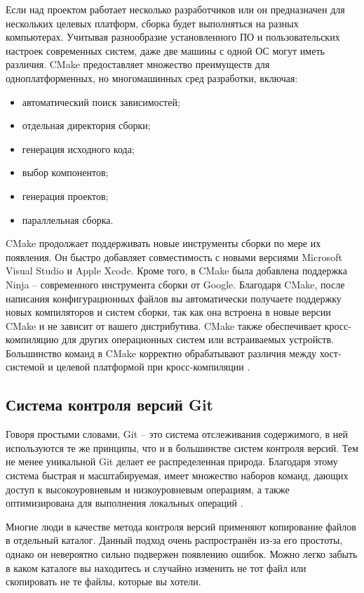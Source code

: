 Если над проектом работает несколько разработчиков или он предназначен для нескольких целевых платформ, сборка будет выполняться на разных компьютерах. Учитывая разнообразие установленного ПО и пользовательских настроек современных систем, даже две машины с одной ОС могут иметь различия. CMake предоставляет множество преимуществ для одноплатформенных, но многомашинных сред разработки, включая:
\begin{itemize}
	\item автоматический поиск зависимостей;
	\item отдельная директория сборки;
	\item генерация исходного кода;
	\item выбор компонентов;
	\item генерация проектов;
	\item параллельная сборка.
\end{itemize}

CMake продолжает поддерживать новые инструменты сборки по мере их появления. Он быстро добавляет совместимость с новыми версиями Microsoft Visual Studio и Apple Xcode. Кроме того, в CMake была добавлена поддержка Ninja -- современного инструмента сборки от Google. Благодаря CMake, после написания конфигурационных файлов вы автоматически получаете поддержку новых компиляторов и систем сборки, так как она встроена в новые версии CMake и не зависит от вашего дистрибутива. CMake также обеспечивает кросс-компиляцию для других операционных систем или встраиваемых устройств. Большинство команд в CMake корректно обрабатывают различия между хост-системой и целевой платформой при кросс-компиляции \cite{CMake}.

\subsection{Система контроля версий Git}

Говоря простыми словами, Git -- это система отслеживания содержимого, в ней используются те же принципы, что и в большинстве систем контроля версий. Тем не менее уникальной Git делает ее распределенная природа. Благодаря этому система быстрая и масштабируемая, имеет множество наборов команд, дающих доступ к высокоуровневым и низкоуровневым операциям, а также оптимизирована для выполнения локальных операций \cite{Git}.

Многие люди в качестве метода контроля версий применяют копирование файлов в
отдельный каталог. Данный подход очень распространён из-за его простоты, однако он невероятно сильно подвержен появлению ошибок. Можно легко забыть в каком каталоге вы находитесь и случайно изменить не тот файл или скопировать не те файлы, которые вы хотели.

